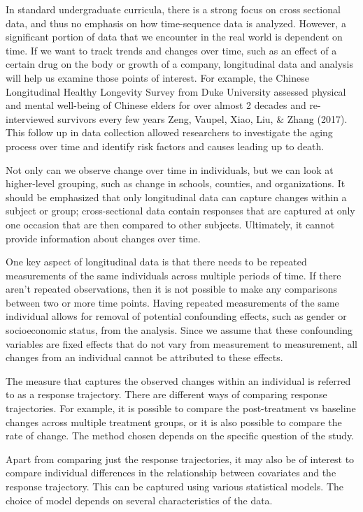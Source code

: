 \documentclass[12pt, twoside]{amherstthesis}
\begin{document}
In standard undergraduate curricula, there is a strong focus on cross sectional data, and thus no emphasis on how time-sequence data is analyzed. However, a significant portion of data that we encounter in the real world is dependent on time. If we want to track trends and changes over time, such as an effect of a certain drug on the body or growth of a company, longitudinal data and analysis will help us examine those points of interest. For example, the Chinese Longitudinal Healthy Longevity Survey from Duke University assessed physical and mental well-being of Chinese elders for over almost 2 decades and re-interviewed survivors every few years Zeng, Vaupel, Xiao, Liu, \& Zhang (2017). This follow up in data collection allowed researchers to investigate the aging process over time and identify risk factors and causes leading up to death.

Not only can we observe change over time in individuals, but we can look at higher-level grouping, such as change in schools, counties, and organizations. It should be emphasized that only longitudinal data can capture changes within a subject or group; cross-sectional data contain responses that are captured at only one occasion that are then compared to other subjects. Ultimately, it cannot provide information about changes over time.

One key aspect of longitudinal data is that there needs to be repeated measurements of the same individuals across multiple periods of time. If there aren't repeated observations, then it is not possible to make any comparisons between two or more time points. Having repeated measurements of the same individual allows for removal of potential confounding effects, such as gender or socioeconomic status, from the analysis. Since we assume that these confounding variables are fixed effects that do not vary from measurement to measurement, all changes from an individual cannot be attributed to these effects.

The measure that captures the observed changes within an individual is referred to as a response trajectory. There are different ways of comparing response trajectories. For example, it is possible to compare the post-treatment vs baseline changes across multiple treatment groups, or it is also possible to compare the rate of change. The method chosen depends on the specific question of the study.

Apart from comparing just the response trajectories, it may also be of interest to compare individual differences in the relationship between covariates and the response trajectory. This can be captured using various statistical models. The choice of model depends on several characteristics of the data.
\end{document}
